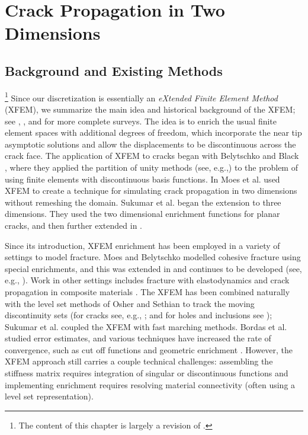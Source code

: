 %

\chapter{Crack Propagation in Two Dimensions} \label{chap:partI.crackpropagation}

\section{Background and Existing Methods}

\footnote{The content of this chapter is largely a revision of \cite{Richardson11}.}
Since our discretization is essentially an \emph{eXtended Finite Element Method} (XFEM), we summarize the main idea and historical background of the XFEM; see \cite{Belytschko09}, \cite{Karihaloo03}, and \cite{Abdelaziz08} for more complete surveys. The idea is to enrich the usual finite element spaces with additional degrees of freedom, which incorporate the near tip asymptotic solutions and allow the displacements to be discontinuous across the crack face. The application of XFEM to cracks began with Belytschko and Black \cite{Belytschko99}, where they applied the partition of unity methods (see, e.g.,\cite{Melenk96}) to the problem of using finite elements with discontinuous basis functions. In \cite{Moes99} Moes et al. used XFEM to create a technique for simulating crack propagation in two dimensions without remeshing the domain. Sukumar et al. \cite{Sukumar00} began the extension to three dimensions. They used the two dimensional enrichment functions for planar cracks, and then further extended in \cite{Areias05}.

Since its introduction, XFEM enrichment has been employed in a variety of settings to model fracture. Moes and Belytschko \cite{Moes02b} modelled cohesive fracture using special enrichments, and this was extended in \cite{Zi.Goangseup03} and continues to be developed (see, e.g., \cite{Mariani03, Borst04, Asferg07}). Work in other settings includes fracture with elastodynamics \cite{Belytschko04} and crack propagation in composite materials \cite{Huynh09}. The XFEM has been combined naturally with the level set methods of Osher and Sethian \cite{Osher88, Osher04} to track the moving discontinuity sets (for cracks see, e.g., \cite{Belytschko01, Moes02a, Gravouil02, Duflot07, Prabel07}; and for holes and inclusions see \cite{Sukumar01}); Sukumar et al. \cite{Sukumar08} coupled the XFEM with fast marching methods. Bordas et al. \cite{Bordas07} studied error estimates, and various techniques have increased the rate of convergence, such as cut off functions and geometric enrichment \cite{Chahine06, Chahine08, Shen09}. However, the XFEM approach still carries a couple technical challenges: assembling the stiffness matrix requires integration of singular or discontinuous functions and implementing enrichment requires resolving material connectivity (often using a level set representation).

